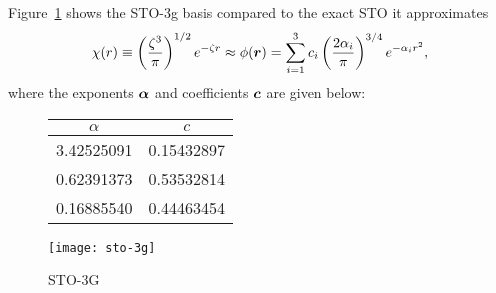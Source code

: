 \begin{comment}
\begin{align}
\chi_{nlm}(r, \theta, \phi;\zeta) \equiv \dfrac{(2\zeta)^{n+1/2}}{\sqrt{(2n)!}}
r^{n-1}e^{-\zeta r} Y_{lm}(\theta, \phi).
\end{align}
\begin{align}
g(r; \sigma) = \dfrac{1}{\sigma\sqrt{2\pi}} e^{-\dfrac{r^2}{2\sigma^2}}.
\end{align}
\end{comment}

Figure~\ref{fig:sto-3g} shows the STO-3g basis compared to the exact STO it approximates
\begin{align}
\chi(r)\equiv \left(\dfrac{\zeta^3}{\pi}\right)^{1/2} e^{-\zeta r} \approx \phi(\boldsymbol{r}) = \sum\limits_{i=1}^3 c_i \left(\dfrac{2\alpha_i}{\pi}\right)^{3/4} e^{-\alpha_ir^2},
\end{align}
where the exponents $\boldsymbol{\alpha}$ and coefficients $\boldsymbol{c}$ are given below:
\begin{figure}[h]
\begin{minipage}{0.29\textwidth}
\begin{tabular}{cc}
\toprule
$\alpha$ & $c$ \\
\midrule
3.42525091 & 0.15432897 \\
0.62391373 & 0.53532814 \\
0.16885540 & 0.44463454 \\
\bottomrule
\end{tabular}
\end{minipage}
\begin{minipage}{0.59\textwidth}
\texttt{[image: sto-3g]}
\end{minipage}
\caption{STO-3G}
\label{fig:sto-3g}
\end{figure}


